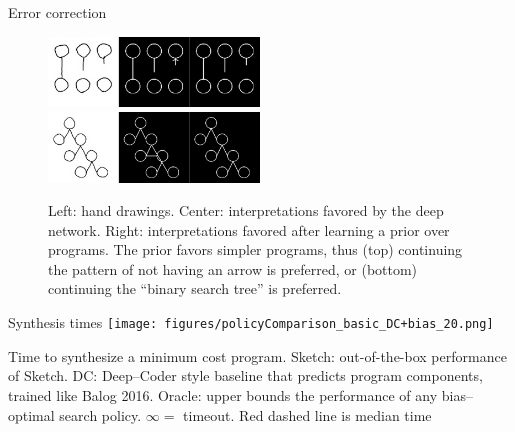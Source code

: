 \documentclass[final]{beamer}
\newlength{\onecolwid}
\begin{document}
\begin{frame}[t]
\begin{columns}[t]
\begin{column}{\onecolwid}
\begin{block}{Error correction}
    \vspace{2cm}
    \begin{figure}
        \includegraphics[width = 0.5\textwidth]{figures/programSuccess7.png}\\
  \includegraphics[width = 0.5\textwidth]{figures/programSuccess16.png}
  \caption{Left: hand drawings. Center: interpretations favored by the deep network. Right: interpretations favored after learning a prior over programs. The prior favors  simpler programs, thus (top) continuing the pattern of not having an arrow is preferred, or (bottom) continuing the ``binary search tree'' is preferred.}
    \end{figure}
\vspace{-1cm}
  \end{block}

  \begin{block}{Synthesis times}    
    \texttt{[image: figures/policyComparison\_basic\_DC+bias\_20.png]}

{\small Time to synthesize a minimum cost program. Sketch: out-of-the-box performance of Sketch. DC: Deep--Coder style baseline that predicts program components, trained like Balog 2016. Oracle:  upper bounds  the performance of any bias--optimal search policy. $\infty = $ timeout. Red dashed line is median time}
    \end{block}






\end{column}
\end{columns}
\end{frame}
\end{document}
